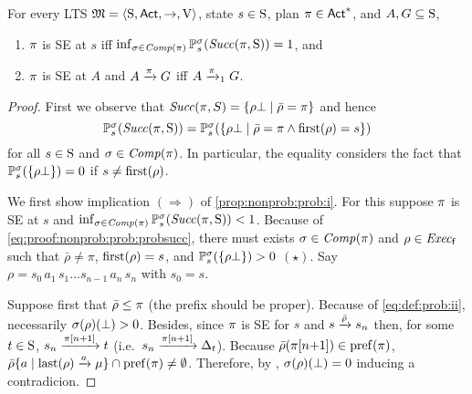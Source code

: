 \begin{proposition}\label{prop:nonprob:prob}
  For every LTS $\model=\tup{\S,\Act,\ra,\V}$, state $s\in\S$, plan
  $\plan\in\Act^*$, and $A,G\subseteq\S$,
  \begin{enumerate}
  \item\label{prop:nonprob:prob:i}%
    $\plan$ is SE at $s$ iff
    $\inf_{\strat\in\Comp(\plan)}\Prob^\strat_s(\Succ(\plan,\S))=1$,
    and
  \item\label{prop:nonprob:prob:ii}%
    $\plan$ is SE at $A$ and $A \reach{\plan} G$ iff $A \reach{\plan}_1 G$.
  \end{enumerate}
\end{proposition}
%
%
%
\begin{proof}
  First we observe that
  $\Succ(\plan,S) = \{{\rho\complete}\mid{\bar{\rho}=\plan}\}$
  and hence
  \begin{equation}\label{eq:proof:nonprob:prob:probsucc}
    \textstyle
    \Prob^\strat_s(\Succ(\plan,\S)) =
    \Prob^\strat_s(\{{\rho\complete}\mid{\bar{\rho}=\plan}\wedge{\first(\rho)=s}\})
  \end{equation}
  for all $s\in\S$ and $\strat\in\Comp(\plan)$. In particular, the
  equality considers the fact that
  $\Prob^\strat_s(\{\rho\complete\})=0$ if $s\neq\first(\rho)$.

  We first show implication $(\Rightarrow)$ of
  \cref{prop:nonprob:prob:i}.
  For this suppose $\plan$ is SE at $s$ and
  $\inf_{\strat\in\Comp(\plan)}\Prob^\strat_s(\Succ(\plan,\S))<1$.
  Because of \cref{eq:proof:nonprob:prob:probsucc}, there must exists
  $\strat\in\Comp(\plan)$ and $\rho\in\execf$ such that
  $\bar{\rho}\neq\pi$, $\first(\rho)=s$, and
  $\Prob^\strat_s(\{\rho\complete\})>0$ $(\star)$.
  Say $\rho=s_0\, a_1\, s_1\ldots s_{n-1}\, a_n\, s_n$ with $s_0=s$.

  Suppose first that $\bar{\rho}\leq\plan$ (the prefix should be
  proper).  Because of \cref{eq:def:prob:ii}, necessarily
  $\strat(\rho)(\complete) > 0$.  Besides, since $\plan$ is SE for $s$
  and $s\reach{\bar{\rho}}s_n$ then, for some $t\in\S$,
  $s_n\reach{\plan[n{+}1]}t$ (i.e.\ $s_n\reach{\plan[n{+}1]}\Dirac_t$).
  Because $\bar{\rho}(\plan[n{+}1])\in\pref(\plan)$,
  $\bar{\rho}\{a\mid{\last(\rho)\reach{a}\mu}\}\cap\pref(\plan)\neq\emptyset$.
  Therefore, by , $\strat(\rho)(\complete) = 0$
  inducing a contradicion.


\end{proof}
